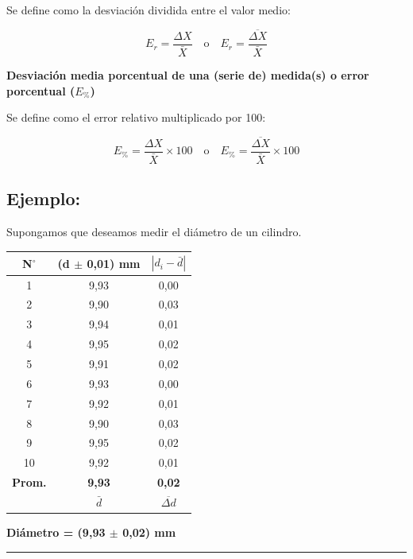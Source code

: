 \documentclass[12pt,a4paper]{article}
\begin{document}
Se define como la desviación dividida entre el valor medio:

\begin{equation}
E_r = \frac{\Delta X}{\bar{X}} \quad \text{o} \quad E_r = \frac{\overline{\Delta X}}{\bar{X}} \tag{10}
\end{equation}

\textbf{Desviación media porcentual de una (serie de) medida(s) o error porcentual ($E_{\%}$)}

Se define como el error relativo multiplicado por 100:

\begin{equation}
E_{\%} = \frac{\Delta X}{\bar{X}} \times 100 \quad \text{o} \quad E_{\%} = \frac{\overline{\Delta X}}{\bar{X}} \times 100 \tag{11}
\end{equation}

\subsection*{Ejemplo:}
Supongamos que deseamos medir el diámetro de un cilindro.

\begin{table}[h!]
\centering
\begin{tabular}{|c|c|c|}
\hline
\textbf{N$^\circ$} & \textbf{(d $\pm$ 0,01) mm} & \textbf{$| d_i - \bar{d} |$} \\ \hline
1 & 9,93 & 0,00 \\ \hline
2 & 9,90 & 0,03 \\ \hline
3 & 9,94 & 0,01 \\ \hline
4 & 9,95 & 0,02 \\ \hline
5 & 9,91 & 0,02 \\ \hline
6 & 9,93 & 0,00 \\ \hline
7 & 9,92 & 0,01 \\ \hline
8 & 9,90 & 0,03 \\ \hline
9 & 9,95 & 0,02 \\ \hline
10 & 9,92 & 0,01 \\ \hline
\textbf{Prom.} & \textbf{9,93} & \textbf{0,02} \\ \hline
& $\bar{d}$ & $\overline{\Delta d}$ \\ \hline
\end{tabular}
\end{table}

\textbf{Diámetro = (9,93 $\pm$ 0,02) mm}

\vspace{0.5cm}
\hrule
\vspace{0.5cm}
\end{document}
